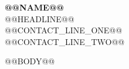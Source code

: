 \documentclass[10pt,letterpaper]{article}
\begin{document}
\begin{center}
  {\fontsize{25}{28}\selectfont\bfseries\color{Ink} @@NAME@@}\\[4pt]
  {\large\color{Teal} @@HEADLINE@@}\\[6pt]
  {\small @@CONTACT_LINE_ONE@@}\\[2pt]
  {\small @@CONTACT_LINE_TWO@@}
\end{center}
\vspace{3pt}

@@BODY@@
\end{document}
